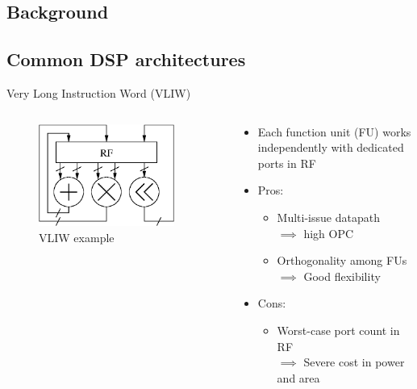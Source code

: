 \documentclass{beamer}
\begin{document}
\begin{CJK}{UTF8}{bkai}
    \section{Background}
    \subsection{Common DSP architectures}
    \begin{frame}{Very Long Instruction Word (VLIW)}
       \begin{columns}
           \begin{column}{0.4\textwidth}
               \begin{figure}[!ht]
                   \centering
                   \includegraphics[width=0.9\textwidth]{./figs/vliw.eps}
                   \caption{VLIW example}
               \end{figure}
           \end{column}
           \begin{column}{0.6\textwidth}
              \begin{itemize}
                  \item Each function unit (FU) works independently with dedicated ports in RF
                  \item Pros:
                      \begin{itemize}
                          \item Multi-issue datapath \\ $\implies$ high OPC
                          \item Orthogonality among FUs \\ $\implies$ Good flexibility
                      \end{itemize}
                 \item Cons:
                     \begin{itemize}
                         \item Worst-case port count in RF \\ $\implies$ Severe cost in power and area
                     \end{itemize}
              \end{itemize} 
           \end{column}
       \end{columns} 
    \end{frame}


\end{CJK}
\end{document}
